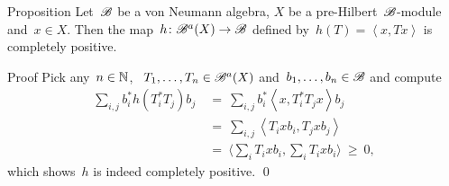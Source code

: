 \documentclass[b]{subfiles}
\begin{document}
\begin{parsec}%
\begin{point}{Proposition}%
Let~$\mathscr{B}$ be a von Neumann algebra,
    $X$ be a pre-Hilbert~$\mathscr{B}$-module
    and~$x \in X$.
Then the map~$h\colon \mathscr{B}^a(X )\to \mathscr{B}$
defined by~$h(T) = \left<x,Tx\right>$
is completely positive.
\begin{point}{Proof}%
Pick any~$n \in \mathbb{N}$, ~$T_1, \ldots, T_n \in \mathscr{B}^a(X)$
    and~$b_1, \ldots, b_n \in \mathscr{B}$
    and compute
\begin{align*}
\sum_{i,j} b_i^* h(T_i^*T_j)b_j
&\ =\ \sum_{i,j} b_i^* \left<x,T_i^*T_j x\right> b_j\\
&\ =\ \sum_{i,j} \left<T_i x b_i,T_j x b_j\right>  \\
&\ =\ \bigl\langle\sum_i T_i x b_i, \sum_i T_i x b_i\bigr\rangle \ \geq\  0,
\end{align*}
which shows~$h$ is indeed completely positive. \qed
\end{point}
\end{point}
\end{parsec}
\end{document}
